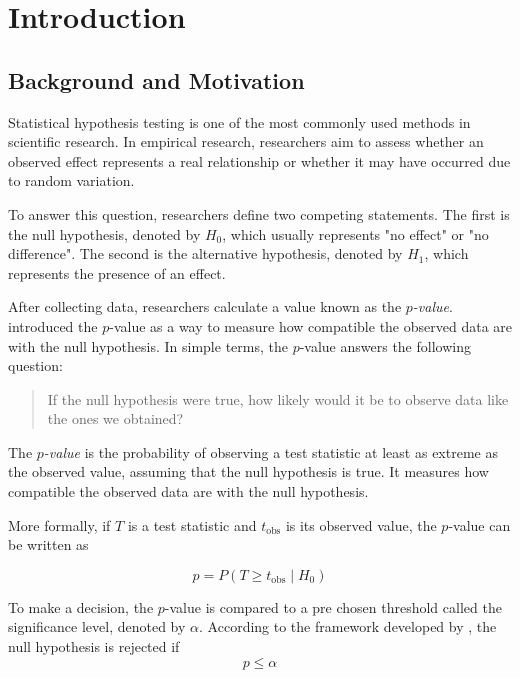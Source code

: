 
\chapter{Introduction}
\label{chapter:Intro}
\section{Background and Motivation}

Statistical hypothesis testing is one of the most commonly used methods in scientific research. In empirical research, researchers aim to assess whether an observed effect represents a real relationship or whether it may have occurred due to random variation.

To answer this question, researchers define two competing statements. The first is the null hypothesis, denoted by $H_0$, which usually represents "no effect" or "no difference". The second is the alternative hypothesis, denoted by $H_1$, which represents the presence of an effect.

After collecting data, researchers calculate a value known as the \emph{$p$-value}. \cite{Fisher1925} introduced the $p$-value as a way to measure how compatible the observed data are with the null hypothesis. In simple terms, the $p$-value answers the following question:

\begin{quote}
	If the null hypothesis were true, how likely would it be to observe data like the ones we obtained?
\end{quote}

The \textit{$p$-value} is the probability of observing a test statistic at least as extreme as the observed value, assuming that the null hypothesis is true. It measures how compatible the observed data are with the null hypothesis.

More formally, if $T$ is a test statistic and $t_{\text{obs}}$ is its observed value, the $p$-value can be written as

\begin{equation}
	p = P(T \geq t_{\text{obs}} \mid H_0)
	\end{equation}



To make a decision, the $p$-value is compared to a pre chosen threshold called the significance level, denoted by $\alpha$. According to the framework developed by \cite{NeymanPearson1933}, the null hypothesis is rejected if
\begin{equation}
	p \leq \alpha
\end{equation}

